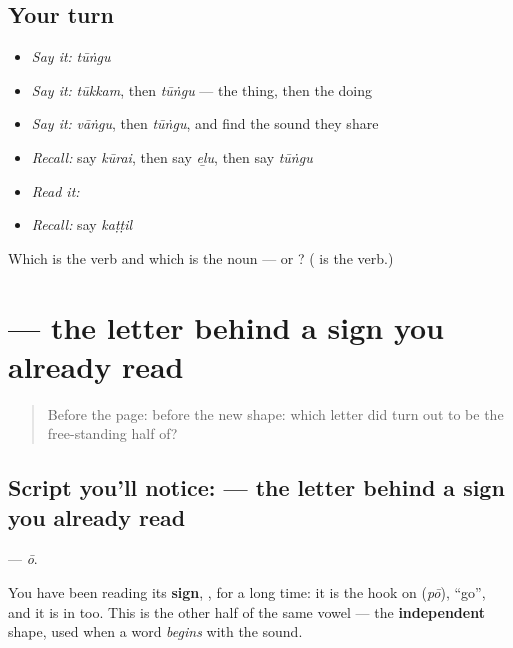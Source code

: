 \subsection*{Your turn}
\begin{itemize}
\raggedright
  \item \emph{Say it:} \emph{tūṅgu}
  \item \emph{Say it:} \emph{tūkkam}, then \emph{tūṅgu} — the thing, then the doing
  \item \emph{Say it:} \emph{vāṅgu}, then \emph{tūṅgu}, and find the sound they share
  \item \emph{Recall:} say \emph{kūrai}, then say \emph{eḻu}, then say \emph{tūṅgu}
  \item \emph{Read it:} \textbf{}
  \item \emph{Recall:} say \emph{kaṭṭil}
\end{itemize}

\begin{tcolorbox}[breakable,colback=teal!4,colframe=teal!35!black,title={Before you move on}]
Which is the verb and which is the noun —  or ? (\textbf{} is the verb.)
\end{tcolorbox}
\section[\texorpdfstring{\ta{ஓ} (ō)}{ஓ (ō)}]{ — the letter behind a sign you already read}

\label{lesson:TA-S126-letter-oo}



\begin{quote}
Before the page: before the new shape: which letter did  turn out to be the free-standing half of?
\end{quote}

\subsection*{Script you'll notice:  — the letter behind a sign you already read}

\textbf{} — \emph{ō}.

You have been reading its \textbf{sign}, , for a long time: it is the hook on  (\emph{pō}), \textquotedblleft{}go\textquotedblright{}, and it is in  too. This is the other half of the same vowel — the \textbf{independent} shape, used when a word \emph{begins} with the sound.

